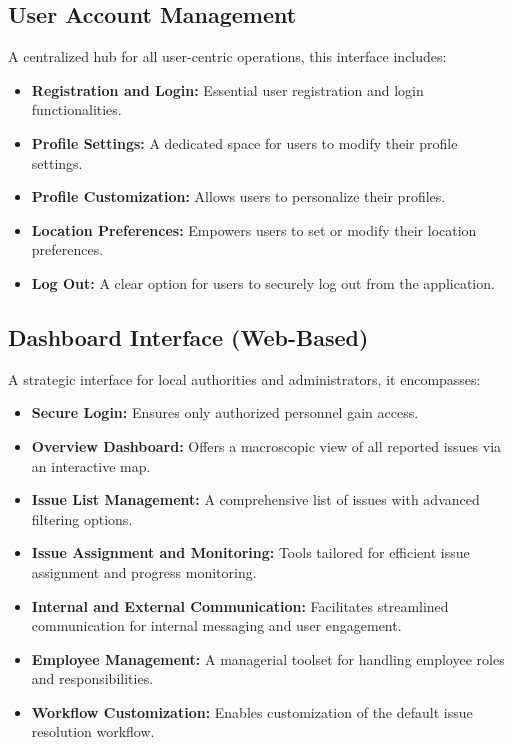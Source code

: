 \subsection{User Account Management}
    A centralized hub for all user-centric operations, this interface includes:
    
    \begin{itemize}
        \item \textbf{Registration and Login:} Essential user registration and login functionalities.
        \item \textbf{Profile Settings:} A dedicated space for users to modify their profile settings.
        \item \textbf{Profile Customization:} Allows users to personalize their profiles.
        \item \textbf{Location Preferences:} Empowers users to set or modify their location preferences.
        \item \textbf{Log Out:} A clear option for users to securely log out from the application.
    \end{itemize}

\subsection{Dashboard Interface (Web-Based)}
    A strategic interface for local authorities and administrators, it encompasses:
    
    \begin{itemize}
        \item \textbf{Secure Login:} Ensures only authorized personnel gain access.
        \item \textbf{Overview Dashboard:} Offers a macroscopic view of all reported issues via an interactive map.
        \item \textbf{Issue List Management:} A comprehensive list of issues with advanced filtering options.
        \item \textbf{Issue Assignment and Monitoring:} Tools tailored for efficient issue assignment and progress monitoring.
        \item \textbf{Internal and External Communication:} Facilitates streamlined communication for internal messaging and user engagement.
        \item \textbf{Employee Management:} A managerial toolset for handling employee roles and responsibilities.
        \item \textbf{Workflow Customization:} Enables customization of the default issue resolution workflow.
    \end{itemize}

